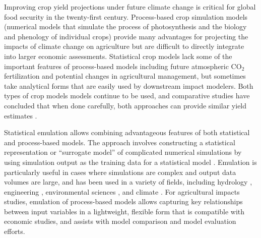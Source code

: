 \documentclass[gmd, manuscript]{copernicus} %
\begin{document}

\introduction
\label{S:1}
Improving crop yield projections under future climate change is critical for global food security in the twenty-first century. 
Process-based crop simulation models (numerical models that simulate the process of photosynthesis and the biology and phenology of individual crops) provide many advantages for projecting the impacts of climate change on agriculture but are difficult to directly integrate into larger economic assessments. 
Statistical crop models lack some of the important features of process-based models including future atmospheric CO$_2$ fertilization and potential changes in agricultural management, but sometimes take analytical forms that are easily used by downstream impact modelers. 
Both types of crop models models continue to be used, and comparative studies have concluded that when done carefully, both approaches can provide similar yield estimates \citep[e.g.][]{Lobell2010, Moore2017, Roberts2017, zhao2017}. 

Statistical emulation allows combining advantageous features of both statistical and process-based models. 
The approach involves constructing a statistical representation or ``surrogate model'' of complicated numerical simulations by using simulation output as the training data for a statistical model \citep[e.g.][]{OHAGAN2006, OHAGAN2010}. 
Emulation is particularly useful in cases where simulations are complex and output data volumes are large,  and  has been used in a variety of fields, including hydrology \citep[e.g.][]{Razavi2012}, engineering \citep[e.g.][]{STORLIE2009}, environmental sciences \citep[e.g.][]{RATTO2012}, and climate \citep[e.g.][]{Castruccio14, Holden2014}. 
For agricultural impacts studies, emulation of process-based models allows capturing key relationships between input variables in a lightweight, flexible form that is compatible with economic studies, and assists with model comparison and model evaluation efforts.
\end{document}
